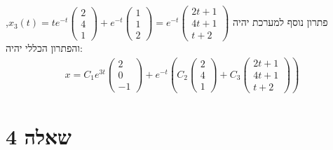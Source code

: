 \documentclass{article}
\begin{document}
פתרון נוסף למערכת יהיה $x_3(t)=te^{-t}\begin{pmatrix}
        2 \\
        4 \\
        1
    \end{pmatrix}+e^{-t}\begin{pmatrix}
        1 \\
        1 \\
        2
    \end{pmatrix}=e^{-t}\begin{pmatrix}
        2t+1 \\
        4t+1 \\
        t+2
    \end{pmatrix}$, והפתרון הכללי יהיה:
\begin{align*}
    x=C_1e^{3t}\begin{pmatrix}
                   2 \\
                   0 \\
                   -1
               \end{pmatrix}
    +e^{-t}(C_2\begin{pmatrix}
                   2 \\
                   4 \\
                   1
               \end{pmatrix}+C_3\begin{pmatrix}
                                    2t+1 \\
                                    4t+1 \\
                                    t+2
                                \end{pmatrix})
\end{align*}

\pagebreak

\section*{שאלה 4}
\end{document}
